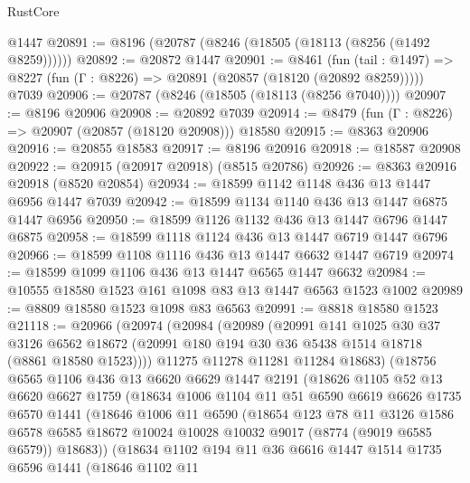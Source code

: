 \begin{lexlean}{RustCore}
\begin{coremodule}
    @1447
@20891 := @8196 (@20787 (@8246 (@18505 (@18113 (@8256 (@1492 @8259))))))
@20892 := @20872 @1447
@20901 := @8461
    (fun (tail : @1497) => @8227 (fun (Γ : @8226) => @20891 (@20857 (@18120 (@20892 @8259)))))
    @7039
@20906 := @20787 (@8246 (@18505 (@18113 (@8256 @7040))))
@20907 := @8196 @20906
@20908 := @20892 @7039
@20914 := @8479 (fun (Γ : @8226) => @20907 (@20857 (@18120 @20908))) @18580
@20915 := @8363 @20906
@20916 := @20855 @18583
@20917 := @8196 @20916
@20918 := @18587 @20908
@20922 := @20915 (@20917 @20918) (@8515 @20786)
@20926 := @8363 @20916 @20918 (@8520 @20854)
@20934 := @18599 @1142 @1148 @436 @13 @1447 @6956 @1447 @7039
@20942 := @18599 @1134 @1140 @436 @13 @1447 @6875 @1447 @6956
@20950 := @18599 @1126 @1132 @436 @13 @1447 @6796 @1447 @6875
@20958 := @18599 @1118 @1124 @436 @13 @1447 @6719 @1447 @6796
@20966 := @18599 @1108 @1116 @436 @13 @1447 @6632 @1447 @6719
@20974 := @18599 @1099 @1106 @436 @13 @1447 @6565 @1447 @6632
@20984 := @10555 @18580 @1523 @161 @1098 @83 @13 @1447 @6563 @1523 @1002
@20989 := @8809 @18580 @1523 @1098 @83 @6563
@20991 := @8818 @18580 @1523
@21118 := @20966
    (@20974
      (@20984
        (@20989
          (@20991
            @141
            @1025
            @30
            @37
            @3126
            @6562
            @18672
            (@20991 @180 @194 @30 @36 @5438 @1514 @18718 (@8861 @18580 @1523))))
        @11275
        @11278
        @11281
        @11284
        @18683)
      (@18756
        @6565
        @1106
        @436
        @13
        @6620
        @6629
        @1447
        @2191
        (@18626
          @1105
          @52
          @13
          @6620
          @6627
          @1759
          (@18634
            @1006
            @1104
            @11
            @51
            @6590
            @6619
            @6626
            @1735
            @6570
            @1441
            (@18646
              @1006
              @11
              @6590
              (@18654
                @123
                @78
                @11
                @3126
                @1586
                @6578
                @6585
                @18672
                @10024
                @10028
                @10032
                @9017
                (@8774 (@9019 @6585 @6579))
                @18683))
            (@18634
              @1102
              @194
              @11
              @36
              @6616
              @1447
              @1514
              @1735
              @6596
              @1441
              (@18646
                @1102
                @11

\end{coremodule}
\end{lexlean}
